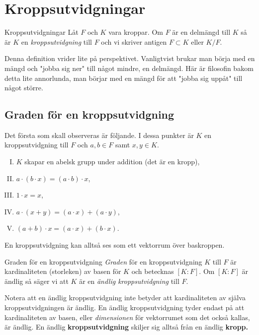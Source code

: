 \documentclass{article}
\theoremstyle{definition}
\begin{document}
\section{Kroppsutvidgningar}
\begin{mydef}{Kroppsutvidgningar}{}
  Låt $F$ och $K$ vara kroppar. Om $F$ är en delmängd till $K$ så är $K$ en \textit{kroppsutvidgning} till $F$ och vi skriver antigen $F \subset K$ eller $K/F$.
\end{mydef}
Denna definition vrider lite på perspektivet. Vanligtvist brukar man börja med en mängd och "jobba sig ner" till något mindre, en delmängd. Här är filosofin bakom detta lite 
annorlunda, man börjar med en mängd för att "jobba sig uppåt" till något större. 

\subsection{Graden för en kroppsutvidgning}
Det första som skall observeras är följande. I dessa punkter är $K$ en kroppsutvidgning till $F$ och $a, b \in F$ samt $x, y \in K$.

\begin{enumerate}[I)]
  \item $K$ skapar en abelsk grupp under addition (det är en kropp),
  \item $a \cdot (b \cdot x) = (a \cdot b) \cdot x$,
  \item $1 \cdot x = x$,
  \item $a \cdot (x + y) = (a \cdot x) + (a \cdot y)$,
  \item $(a + b) \cdot x = (a \cdot x) + (b \cdot x)$.
\end{enumerate}
En kroppsutvidgning kan alltså ses som ett vektorrum över baskroppen. 

\begin{mydef}{Graden för en kroppsutvidgning}{}
  \textit{Graden} för en kroppsutvidgning $K$ till $F$ är kardinaliteten (storleken) av basen för $K$ och betecknas $[K:F]$. Om $[K:F]$ är ändlig så 
  säger vi att $K$ är en \textit{ändlig kroppsutvidgning} till $F$. 
\end{mydef}
Notera att en ändlig kroppsutvidgning inte betyder att kardinaliteten av själva kroppsutvidgningen är ändlig. En ändlig kroppsutvidgning
tyder endast på att kardinaliteten av basen, eller \textit{dimensionen} för vektorrumet som det också kallas, är ändlig. En ändlig 
\textbf{kroppsutvidgning} skiljer sig alltså från en ändlig \textbf{kropp.}
\end{document}
